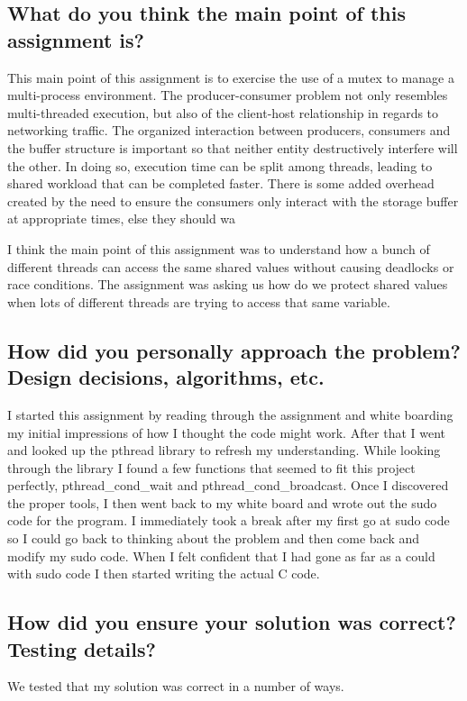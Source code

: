 \documentclass[a4paper]{article}
\begin{document}
\subsection{What do you think the main point of this assignment is?}
This main point of this assignment is to exercise the use of a mutex to manage a multi-process environment. The producer-consumer problem not only resembles multi-threaded execution, but also of the client-host relationship in regards to networking traffic. The organized interaction between producers, consumers and the buffer structure is important so that neither entity destructively interfere will the other. In doing so, execution time can be split among threads, leading to shared workload that can be completed faster. There is some added overhead created by the need to ensure the consumers only interact with the storage buffer at appropriate times, else they should wa

I think the main point of this assignment was to understand how a bunch of different threads can access the same shared values without causing deadlocks or race conditions. The assignment was asking us how do we protect shared values when lots of different threads are trying to access that same variable.

\subsection{How did you personally approach the problem? Design decisions, algorithms, etc.}
I started this assignment by reading through the assignment and white boarding my initial impressions of how I thought the code might work. After that I went and looked up the pthread library to refresh my understanding. While looking through the library I found a few functions that seemed to fit this project perfectly, pthread\_cond\_wait and pthread\_cond\_broadcast. Once I discovered the proper tools, I then went back to my white board and wrote out the sudo code for the program. I immediately took a break after my first go at sudo code so I could go back to thinking about the problem and then come back and modify my sudo code. When I felt confident that I had gone as far as a could with sudo code I then started writing the actual C code. 


\subsection{How did you ensure your solution was correct? Testing details?}
We tested that my solution was correct in a number of ways.  
\end{document}
